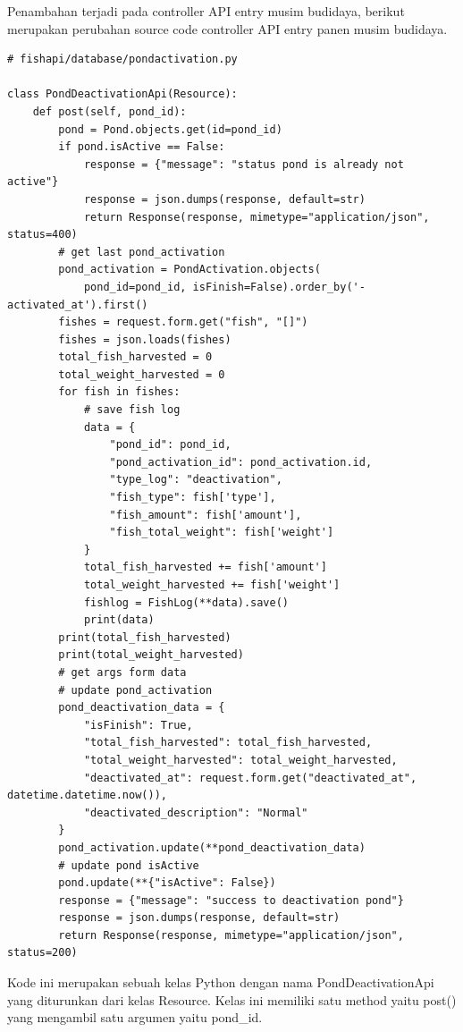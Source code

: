 \begin{enumerate}[1.]
Penambahan terjadi pada controller API entry musim budidaya, berikut merupakan perubahan source code controller API entry panen musim budidaya.

\begin{lstlisting}
# fishapi/database/pondactivation.py

class PondDeactivationApi(Resource):
    def post(self, pond_id):
        pond = Pond.objects.get(id=pond_id)
        if pond.isActive == False:
            response = {"message": "status pond is already not active"}
            response = json.dumps(response, default=str)
            return Response(response, mimetype="application/json", status=400)
        # get last pond_activation
        pond_activation = PondActivation.objects(
            pond_id=pond_id, isFinish=False).order_by('-activated_at').first()
        fishes = request.form.get("fish", "[]")
        fishes = json.loads(fishes)
        total_fish_harvested = 0
        total_weight_harvested = 0
        for fish in fishes:
            # save fish log
            data = {
                "pond_id": pond_id,
                "pond_activation_id": pond_activation.id,
                "type_log": "deactivation",
                "fish_type": fish['type'],
                "fish_amount": fish['amount'],
                "fish_total_weight": fish['weight']
            }
            total_fish_harvested += fish['amount']
            total_weight_harvested += fish['weight']
            fishlog = FishLog(**data).save()
            print(data)
        print(total_fish_harvested)
        print(total_weight_harvested)
        # get args form data
        # update pond_activation
        pond_deactivation_data = {
            "isFinish": True,
            "total_fish_harvested": total_fish_harvested,
            "total_weight_harvested": total_weight_harvested,
            "deactivated_at": request.form.get("deactivated_at", datetime.datetime.now()),
            "deactivated_description": "Normal"
        }
        pond_activation.update(**pond_deactivation_data)
        # update pond isActive
        pond.update(**{"isActive": False})
        response = {"message": "success to deactivation pond"}
        response = json.dumps(response, default=str)
        return Response(response, mimetype="application/json", status=200)
\end{lstlisting}

Kode ini merupakan sebuah kelas Python dengan nama PondDeactivationApi yang diturunkan dari kelas Resource. Kelas ini memiliki satu method yaitu post() yang mengambil satu argumen yaitu pond\_id.


\end{enumerate}
